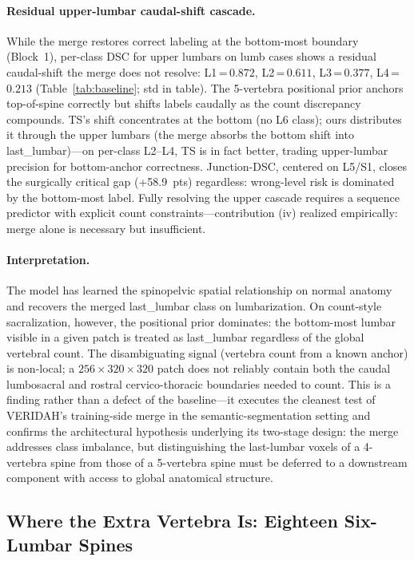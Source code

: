 \documentclass{article}
\newcommand{\sota}{TS}
\newcommand{\VERIDAH}{VERIDAH}
\begin{document}
\paragraph{Residual upper-lumbar caudal-shift cascade.}
While the merge restores correct labeling at the
bottom-most boundary (Block~1), per-class DSC for upper
lumbars on lumb cases shows a residual caudal-shift the
merge does not resolve: L1\,=\,$0.872$, L2\,=\,$0.611$,
L3\,=\,$0.377$, L4\,=\,$0.213$
(Table~\ref{tab:baseline}; std in table). The 5-vertebra
positional prior anchors top-of-spine correctly but
shifts labels caudally as the count discrepancy
compounds. \sota{}'s shift concentrates at the bottom
(no L6 class); ours distributes it through the upper
lumbars (the merge absorbs the bottom shift into
last\_lumbar)---on per-class L2--L4, \sota{} is in fact
better, trading upper-lumbar precision for bottom-anchor
correctness. Junction-DSC, centered on L5/S1, closes the
surgically critical gap (+58.9~pts) regardless: wrong-level
risk is dominated by the bottom-most label. Fully resolving
the upper cascade requires a sequence predictor with
explicit count constraints---contribution (iv) realized
empirically: merge alone is necessary but insufficient.

\paragraph{Interpretation.}
The model has learned the spinopelvic spatial relationship
on normal anatomy and recovers the merged last\_lumbar
class on lumbarization. On count-style sacralization,
however, the positional prior dominates: the bottom-most
lumbar visible in a given patch is treated as
last\_lumbar regardless of the global vertebral count.
The disambiguating signal (vertebra count from a known
anchor) is non-local; a $256{\times}320{\times}320$
patch does not reliably contain both the caudal
lumbosacral and rostral cervico-thoracic boundaries
needed to count. This is a finding rather than a defect
of the baseline---it executes the cleanest test of
\VERIDAH{}'s training-side merge in the
semantic-segmentation setting and confirms the
architectural hypothesis underlying its two-stage
design: the merge addresses class imbalance, but
distinguishing the last-lumbar voxels of a 4-vertebra
spine from those of a 5-vertebra spine must be deferred
to a downstream component with access to global
anatomical structure.

\subsection{Where the Extra Vertebra Is: Eighteen Six-Lumbar Spines}
\label{sec:sixlumbar}
\end{document}
